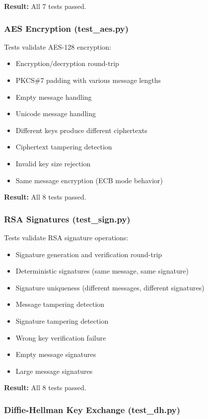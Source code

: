\documentclass[runningheads]{llncs}
\begin{document}
\textbf{Result:} All 7 tests passed.

\subsubsection{AES Encryption (test\_aes.py)}

Tests validate AES-128 encryption:
\begin{itemize}
    \item Encryption/decryption round-trip
    \item PKCS\#7 padding with various message lengths
    \item Empty message handling
    \item Unicode message handling
    \item Different keys produce different ciphertexts
    \item Ciphertext tampering detection
    \item Invalid key size rejection
    \item Same message encryption (ECB mode behavior)
\end{itemize}

\textbf{Result:} All 8 tests passed.

\subsubsection{RSA Signatures (test\_sign.py)}

Tests validate RSA signature operations:
\begin{itemize}
    \item Signature generation and verification round-trip
    \item Deterministic signatures (same message, same signature)
    \item Signature uniqueness (different messages, different signatures)
    \item Message tampering detection
    \item Signature tampering detection
    \item Wrong key verification failure
    \item Empty message signatures
    \item Large message signatures
\end{itemize}

\textbf{Result:} All 8 tests passed.

\subsubsection{Diffie-Hellman Key Exchange (test\_dh.py)}
\end{document}
